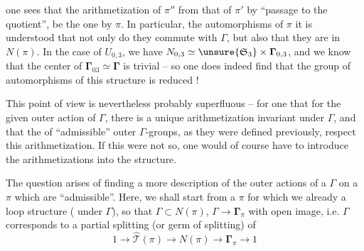 
one sees that the arithmetization of $\pi''$  from that of $\pi'$ by ``passage to the quotient'', be the one  by $\pi$.  In particular,  the automorphisms of $\pi$ it is understood that  not only do they commute with $\Gamma$, but also that they are in $N(\pi)$.  In the case of $U_{0,3}$, we have $N_{0,3}\simeq\unsure{\mathfrak S_3}\times\boldsymbol{\Gamma}_{0,3}$, and we know that the center of $\boldsymbol{\Gamma}_{03}\simeq\boldsymbol{\Gamma}$ is trivial -- so one does indeed find that the group of automorphisms of this structure is reduced  !

This point of view is nevertheless probably superfluous -- for one  that for the given outer action of $\Gamma$, there is a unique arithmetization invariant under $\Gamma$, and that the   of ``admissible'' outer $\Gamma$-groups, as they were defined previously,  respect this arithmetization. If this were not so, one would of course have to introduce the arithmetizations into the structure.




The question arises of finding a more   description of the outer actions of a $\Gamma$ on a $\pi$ which are ``admissible''.  Here, we shall start from a $\pi$ for which we already  a loop structure  ( under $\Gamma$), so  that $\Gamma\subset N(\pi)$, $\Gamma\longrightarrow\boldsymbol{\Gamma}_\pi$  with open image,  i.e. $\Gamma$ corresponds to a partial splitting (or germ of splitting) of 
\[
1\longrightarrow\widehat{\mathcal T}(\pi)\longrightarrow N(\pi)\longrightarrow\boldsymbol{\Gamma}_\pi\longrightarrow1
\]

